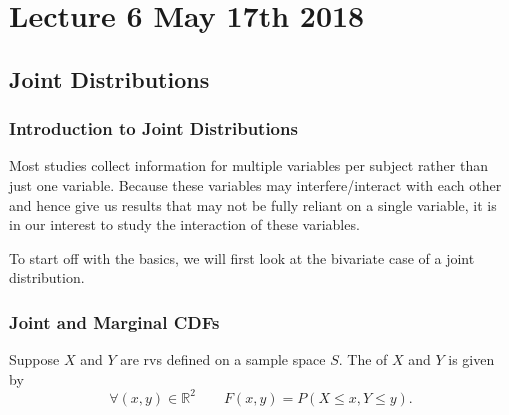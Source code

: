 \documentclass[notoc,notitlepage]{tufte-book}
\begin{document}



\chapter{Lecture 6 May 17th 2018}%
\label{chp:lecture_6_may_17th_2018}

\section{Joint Distributions}%
\label{sec:joint_distributions}

\subsection{Introduction to Joint Distributions}%
\label{sub:introduction_to_joint_distributions}

\begin{note}[Motivation]
  Most studies collect information for multiple variables per subject rather than just one variable. Because these variables may interfere/interact with each other and hence give us results that may not be fully reliant on a single variable, it is in our interest to study the interaction of these variables.

  To start off with the basics, we will first look at the bivariate case of a joint distribution.
\end{note}


\subsection{Joint and Marginal CDFs}%
\label{sub:joint_and_marginal_cdfs}

\begin{defn}
\label{defn:joint_cdf}
  Suppose $X$ and $Y$ are rvs defined on a sample space $S$. The  of $X$ and $Y$ is given by
  \begin{equation*}
    \forall (x, y) \in \mathbb{R}^2 \qquad F(x, y) = P(X \leq x, Y \leq y).
  \end{equation*}
\end{defn}
\end{document}
